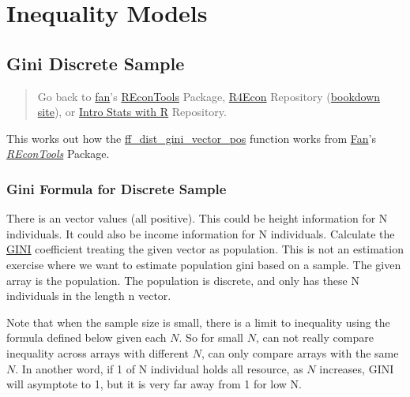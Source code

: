 \documentclass[
]{book}
\begin{document}
\hypertarget{inequality-models}{%
\section{Inequality Models}\label{inequality-models}}

\hypertarget{gini-discrete-sample}{%
\subsection{Gini Discrete Sample}\label{gini-discrete-sample}}

\begin{quote}
Go back to \href{http://fanwangecon.github.io/}{fan}'s \href{https://fanwangecon.github.io/REconTools/}{REconTools} Package, \href{https://fanwangecon.github.io/R4Econ/}{R4Econ} Repository (\href{https://fanwangecon.github.io/R4Econ/bookdown}{bookdown site}), or \href{https://fanwangecon.github.io/Stat4Econ/}{Intro Stats with R} Repository.
\end{quote}

This works out how the \href{https://fanwangecon.github.io/REconTools/reference/ff_dist_gini_vector_pos.html}{ff\_dist\_gini\_vector\_pos} function works from \href{https://fanwangecon.github.io/}{Fan}'s \emph{\href{https://fanwangecon.github.io/REconTools/}{REconTools}} Package.

\hypertarget{gini-formula-for-discrete-sample}{%
\subsubsection{Gini Formula for Discrete Sample}\label{gini-formula-for-discrete-sample}}

There is an vector values (all positive). This could be height information for N individuals. It could also be income information for N individuals. Calculate the \href{https://en.wikipedia.org/wiki/Gini_coefficient}{GINI} coefficient treating the given vector as population. This is not an estimation exercise where we want to estimate population gini based on a sample. The given array is the population. The population is discrete, and only has these N individuals in the length n vector.

Note that when the sample size is small, there is a limit to inequality using the formula defined below given each \(N\). So for small \(N\), can not really compare inequality across arrays with different \(N\), can only compare arrays with the same \(N\). In another word, if 1 of N individual holds all resource, as \(N\) increases, GINI will asymptote to 1, but it is very far away from 1 for low N.
\end{document}
